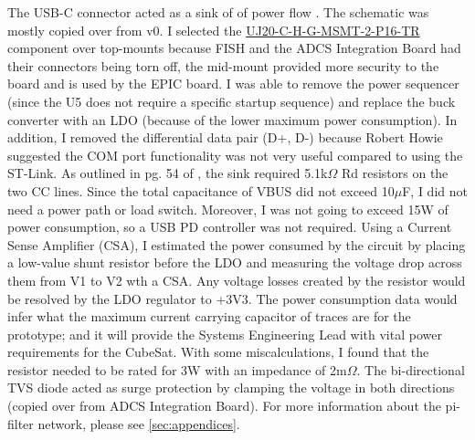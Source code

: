 The USB-C connector acted as a sink of of power flow \cite{ti-usb-typec-guide}. The schematic was mostly copied over from v0. I selected the \href{https://au.mouser.com/ProductDetail/Same-Sky/UJ20-C-H-G-MSMT-2-P16-TR?qs=IKkN%2F947nfBldcIwp9d6BA%3D%3D}{UJ20-C-H-G-MSMT-2-P16-TR} component over top-mounts because FISH and the ADCS Integration Board had their connectors being torn off, the mid-mount provided more security to the board and is used by the EPIC board. I was able to remove the power sequencer (since the U5 does not require a specific startup sequence) and replace the buck converter with an LDO (because of the lower maximum power consumption). In addition, I removed the differential data pair (D+, D-) because Robert Howie suggested the COM port functionality was not very useful compared to using the ST-Link.
\nl
As outlined in pg. 54 of \cite{ti-usb-typec-guide}, the sink required 5.1k$\Omega$ Rd resistors on the two CC lines. Since the total capacitance of VBUS did not exceed 10$\mu$F, I did not need a power path or load switch. Moreover, I was not going to exceed 15W of power consumption, so a USB PD controller was not required.
\nl
Using a Current Sense Amplifier (CSA), I estimated the power consumed by the circuit by placing a low-value shunt resistor before the LDO and measuring the voltage drop across them from V1 to V2 wth a CSA. Any voltage losses created by the resistor would be resolved by the LDO regulator to +3V3. The power consumption data would infer what the maximum current carrying capacitor of traces are for the prototype; and it will provide the Systems Engineering Lead with vital power requirements for the CubeSat. With some miscalculations, I found that the resistor needed to be rated for 3W with an impedance of 2m$\Omega$.
\nl
The bi-directional TVS diode acted as surge protection by clamping the voltage in both directions (copied over from ADCS Integration Board). For more information about the pi-filter network, please see \autoref{sec:appendices}.

